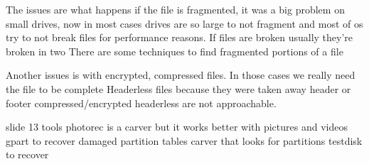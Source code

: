             The issues are what happens if the file is fragmented, it was a big problem on small drives, now in most cases drives are so large to not fragment 
            and most of os try to not break files for performance reasons.
            If files are broken usually they're broken in two 
            There are some techniques to find fragmented portions of a file 

            Another issues is with encrypted, compressed files. In those cases we really need the file to be complete 
            Headerless files because they were taken away header or footer
            compressed/encrypted headerless are not approachable.

            slide 13 tools 
                photorec is a carver but it works better with pictures and videos 
                gpart to recover damaged partition tables carver that looks for partitions
                testdisk to recover 
            


    

